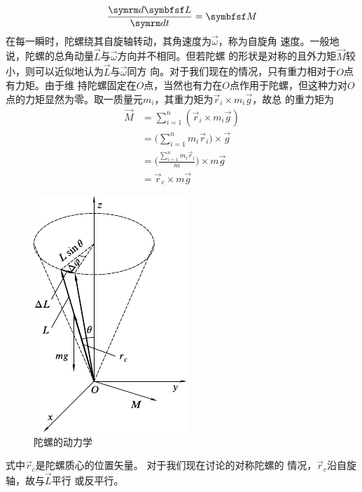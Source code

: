 \clearpage~\vspace{-1.56em}
\begin{equation}\label{eqn:10.05.01}
  \frac { \dif \vec{L} } { \dif t } = \vec{M}
\end{equation}
在每一瞬时，陀螺绕其自旋轴转动，其角速度为$ \vec{\omega} $，称为自旋角
速度。一般地说，陀螺的总角动量$\vec{L}$与$\vec{\omega}$方向并不相同。但若陀螺
的形状是对称的且外力矩$\vec{M}$较小，则可以近似地认为$\vec{L}$与$\vec{\omega}$同方
向。对于我们现在的情况，只有重力相对于$ O $点有力矩。由于维
持陀螺固定在$ O $点，当然也有力在$ O $点作用于陀螺，但这种力对$ O $
点的力矩显然为零。取一质量元$ m _ i $，其重力矩为$ \vec{r} _ { i } \times m _ { i } \vec{g} $，故总
的重力矩为
\begin{equation*}
  \begin{split}
    \vec{M} &= \sum_{ i = 1 } ^ n \left( \vec{r} _ i \times m _ { i } \vec{g} \right) \\
    &= \Bigg( \sum_{ i = 1 } ^ n m _ i \vec{r} _ { i } \Bigg) \times \vec{g} \\
    &= \Bigg( \frac { \sum _{ i = 1 } ^ n m _ i \vec{r} _ i } { m } \Bigg) \times m \vec{g} \\
    &= \vec{r} _ { c } \times m \vec{g}
  \end{split}
\end{equation*}
\begin{figure}
  \vspace{-1em}
  \centering
  \includegraphics{figure/fig10.22}
  \caption{陀螺的动力学}
  \label{fig:10.22}
\end{figure}
式中$ \vec{r} _ c $是陀螺质心的位置矢量。
对于我们现在讨论的对称陀螺的
情况，$ \vec{r} _ c $沿自旋轴，故与$ \vec{L} $平行
或反平行。


